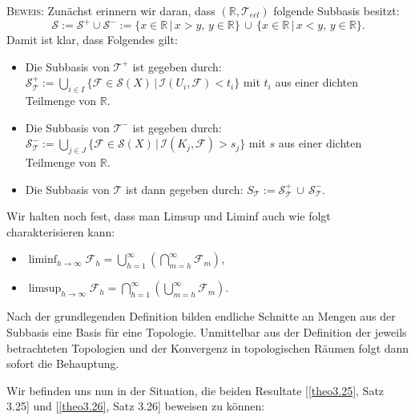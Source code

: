 \textsc{Beweis:} Zunächst erinnern wir daran, dass \((\mathbb{R},\mathcal{T}_{ecl})\) folgende Subbasis besitzt:
\begin{equation}
    \mathcal{S} := \mathcal{S}^+ \cup \mathcal{S}^- := \{x \in \mathbb{R} \, | \, x > y, \, y \in \mathbb{R}\} \, \cup \, \{x \in \mathbb{R} \, | \, x < y, \, y \in \mathbb{R}\}. 
\end{equation}
Damit ist klar, dass Folgendes gilt:
\begin{itemize}
    \item Die Subbasis von \(\mathcal{T}^+\) ist gegeben durch: \(\mathcal{S}_{\mathcal{T}}^+ := \bigcup_{i \in I}\{\mathcal{F} \in \mathcal{S}(X) \, | \, \mathcal{I}(U_i,\mathcal{F}) < t_i\}\) mit \(t_i\) aus einer dichten Teilmenge von \(\mathbb{R}\).
    \item Die Subbasis von \(\mathcal{T}^-\) ist gegeben durch: \(\mathcal{S}_{\mathcal{T}}^- := \bigcup_{j \in J} \{\mathcal{F} \in \mathcal{S}(X) \, | \, \mathcal{I}(K_j,\mathcal{F}) > s_j\}\) mit \(s\) aus einer dichten Teilmenge von \(\mathbb{R}\).
    \item Die Subbasis von \(\mathcal{T}\) ist dann gegeben durch: \(S_{\mathcal{T}} := \mathcal{S}_{\mathcal{T}}^+ \, \cup \, \mathcal{S}_{\mathcal{T}}^-\).
\end{itemize}
Wir halten noch fest, dass man Limsup und Liminf auch wie folgt charakterisieren kann:
\begin{itemize}
    \item \(\liminf_{h \to \infty} \mathcal{F}_h = \bigcup_{h=1}^{\infty}(\bigcap_{m=h}^{\infty} \mathcal{F}_m)\),
    \item \(\limsup_{h \to \infty} \mathcal{F}_h = \bigcap_{h=1}^{\infty}(\bigcup_{m=h}^{\infty} \mathcal{F}_m)\).
\end{itemize}
Nach der grundlegenden Definition bilden endliche Schnitte an Mengen aus der Subbasis eine Basis für eine Topologie. Unmittelbar aus der Definition der jeweils betrachteten Topologien und der Konvergenz in topologischen Räumen folgt dann sofort die Behauptung. \QEDB

Wir befinden uns nun in der Situation, die beiden Resultate [\ref{theo3.25}, Satz 3.25] und [\ref{theo3.26}, Satz 3.26] beweisen zu können:\\

